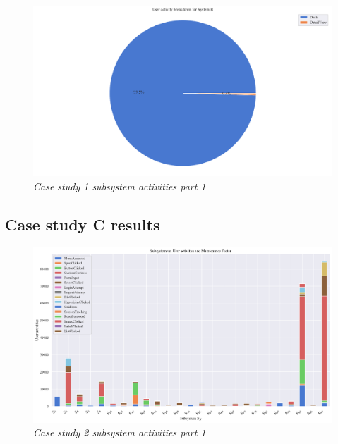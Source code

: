 \begin{figure}[!htb]
	\centering %
	\includegraphics[width=0.95\linewidth]{img/ch3/analysis/case_B_breakdown.pdf}
	\caption[Case study 1 subsystem activities part 1]
	{\textit{Case study 1 subsystem activities part 1}}\label{fig:ch3_caseBBreakdown}
\end{figure}



\clearpage

\subsection{Case study C results}

\begin{figure}[!htb]
	\centering %
	\includegraphics[width=0.95\linewidth]{img/ch3/analysis/case_C_subsystems_1.pdf}
	\caption[Case study 2 subsystem activities part 1]
	{\textit{Case study 2 subsystem activities part 1}}\label{fig:ch3_test}
\end{figure} 

